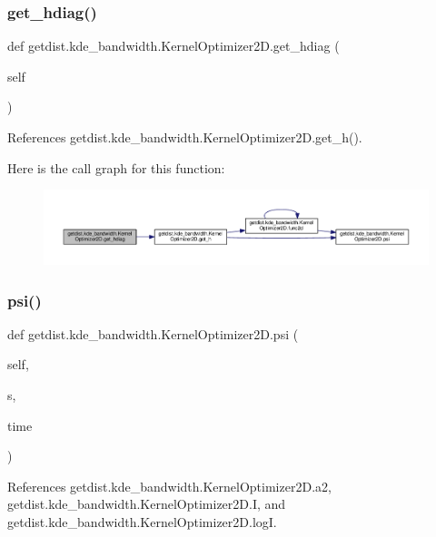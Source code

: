 \subsubsection{\texorpdfstring{get\+\_\+hdiag()}{get\_hdiag()}}
{\footnotesize\ttfamily def getdist.\+kde\+\_\+bandwidth.\+Kernel\+Optimizer2\+D.\+get\+\_\+hdiag (\begin{DoxyParamCaption}\item[{}]{self }\end{DoxyParamCaption})}



References getdist.\+kde\+\_\+bandwidth.\+Kernel\+Optimizer2\+D.\+get\+\_\+h().

Here is the call graph for this function\+:
\nopagebreak
\begin{figure}[H]
\begin{center}
\leavevmode
\includegraphics[width=350pt]{classgetdist_1_1kde__bandwidth_1_1KernelOptimizer2D_ad35e13b353a66f02b5c980e5b69b25ad_cgraph}
\end{center}
\end{figure}
\mbox{\label{classgetdist_1_1kde__bandwidth_1_1KernelOptimizer2D_a7065ba45f5f685a1a6af44d49df74aec}} 
\subsubsection{\texorpdfstring{psi()}{psi()}}
{\footnotesize\ttfamily def getdist.\+kde\+\_\+bandwidth.\+Kernel\+Optimizer2\+D.\+psi (\begin{DoxyParamCaption}\item[{}]{self,  }\item[{}]{s,  }\item[{}]{time }\end{DoxyParamCaption})}



References getdist.\+kde\+\_\+bandwidth.\+Kernel\+Optimizer2\+D.\+a2, getdist.\+kde\+\_\+bandwidth.\+Kernel\+Optimizer2\+D.\+I, and getdist.\+kde\+\_\+bandwidth.\+Kernel\+Optimizer2\+D.\+logI.



